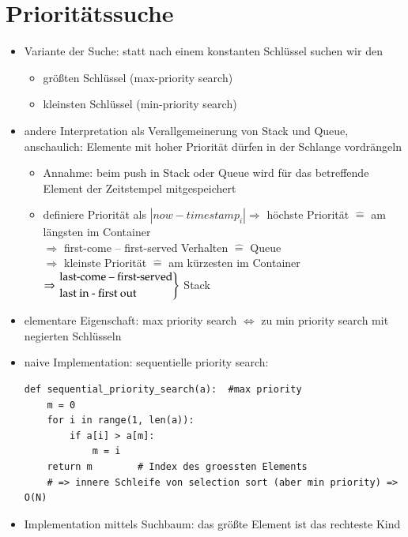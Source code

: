 \section{Prioritätssuche}
\begin{itemize}
    \item Variante der Suche: statt nach einem konstanten Schlüssel suchen wir den
    \begin{itemize}
        \item größten Schlüssel (max-priority search)
        \item kleinsten Schlüssel (min-priority search)
    \end{itemize}
    \item andere Interpretation als Verallgemeinerung von Stack und Queue, anschaulich: Elemente mit hoher Priorität dürfen in der Schlange vordrängeln
    \begin{itemize}
        \item Annahme: beim push in Stack oder Queue wird für das betreffende Element der Zeitstempel mitgespeichert
        \item definiere Priorität als $| now - timestamp_i| \Rightarrow$ höchste Priorität $\widehat{=}$ am längsten im Container \\
        \hspace*{1cm} $\Rightarrow$ first-come – first-served Verhalten $\widehat{=}$ Queue \\
        $\Rightarrow$ kleinste Priorität $\widehat{=}$ am kürzesten im Container $\Rightarrow \begin{rcases} \text{last-come – first-served} \\
            \text{last in - first out}\end{rcases}$ Stack
    \end{itemize}
        \item elementare Eigenschaft: max priority search $\Leftrightarrow$ zu min priority search mit negierten Schlüsseln
        \item naive Implementation: sequentielle priority search:
        \begin{verbatim}
def sequential_priority_search(a):  #max priority
    m = 0
    for i in range(1, len(a)):
        if a[i] > a[m]:
            m = i
    return m        # Index des groessten Elements
    # => innere Schleife von selection sort (aber min priority) => O(N)
        \end{verbatim}
        \item Implementation mittels Suchbaum: das größte Element ist das \glqq rechteste Kind\grqq

\end{itemize}
